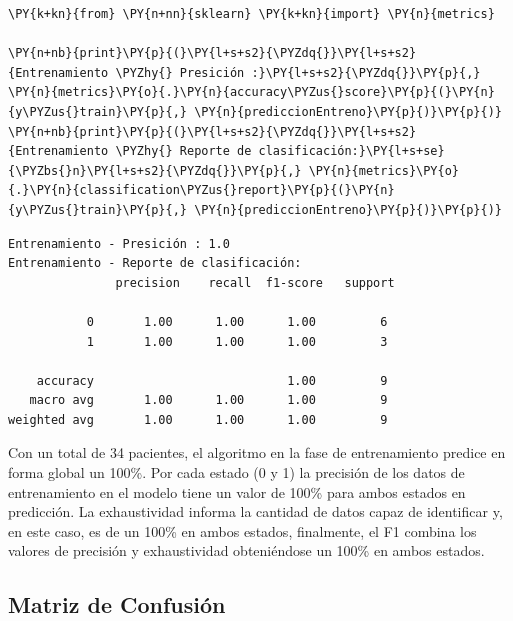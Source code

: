     \begin{tcolorbox}[breakable, size=fbox, boxrule=1pt, pad at break*=1mm,colback=cellbackground, colframe=cellborder]
\begin{Verbatim}[commandchars=\\\{\}]
\PY{k+kn}{from} \PY{n+nn}{sklearn} \PY{k+kn}{import} \PY{n}{metrics}

\PY{n+nb}{print}\PY{p}{(}\PY{l+s+s2}{\PYZdq{}}\PY{l+s+s2}{Entrenamiento \PYZhy{} Presición :}\PY{l+s+s2}{\PYZdq{}}\PY{p}{,} \PY{n}{metrics}\PY{o}{.}\PY{n}{accuracy\PYZus{}score}\PY{p}{(}\PY{n}{y\PYZus{}train}\PY{p}{,} \PY{n}{prediccionEntreno}\PY{p}{)}\PY{p}{)}
\PY{n+nb}{print}\PY{p}{(}\PY{l+s+s2}{\PYZdq{}}\PY{l+s+s2}{Entrenamiento \PYZhy{} Reporte de clasificación:}\PY{l+s+se}{\PYZbs{}n}\PY{l+s+s2}{\PYZdq{}}\PY{p}{,} \PY{n}{metrics}\PY{o}{.}\PY{n}{classification\PYZus{}report}\PY{p}{(}\PY{n}{y\PYZus{}train}\PY{p}{,} \PY{n}{prediccionEntreno}\PY{p}{)}\PY{p}{)}
\end{Verbatim}
\end{tcolorbox}

    \begin{Verbatim}[commandchars=\\\{\}]
Entrenamiento - Presición : 1.0
Entrenamiento - Reporte de clasificación:
               precision    recall  f1-score   support

           0       1.00      1.00      1.00         6
           1       1.00      1.00      1.00         3

    accuracy                           1.00         9
   macro avg       1.00      1.00      1.00         9
weighted avg       1.00      1.00      1.00         9

    \end{Verbatim}

    Con un total de 34 pacientes, el algoritmo en la fase de entrenamiento predice en forma global un 100\%. Por cada estado (0 y 1) la precisión de los datos de entrenamiento en el modelo tiene un valor de 100\% para ambos estados en predicción. La exhaustividad informa la cantidad de datos capaz de identificar y, en este caso, es de un 100\% en ambos estados, finalmente, el F1 combina los valores de precisión y exhaustividad obteniéndose un 100\% en ambos estados.

    \hypertarget{matriz-de-confusiuxf3n}{%
\subsection{Matriz de Confusión}\label{matriz-de-confusiuxf3n}}

